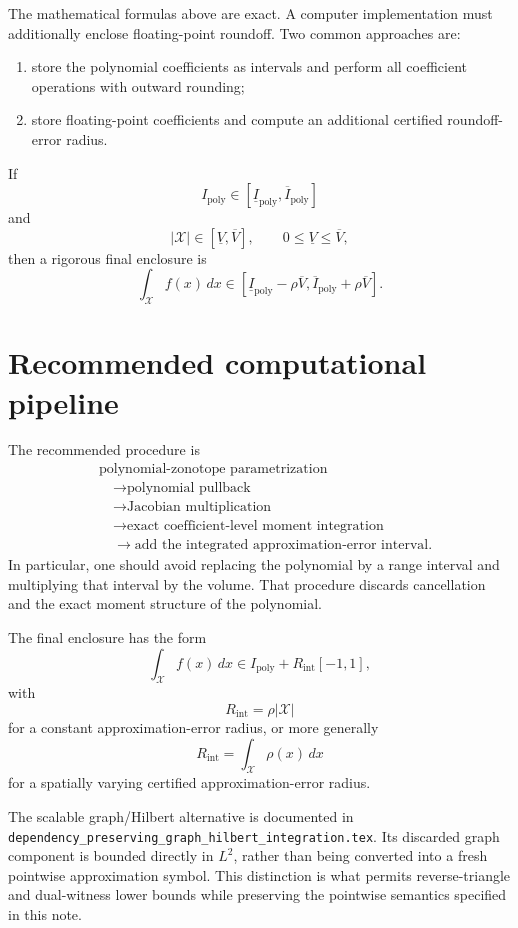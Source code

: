 \documentclass[11pt]{article}
\newcommand{\abs}[1]{\left\lvert #1\right\rvert}
\begin{document}
The mathematical formulas above are exact. A computer implementation must additionally enclose floating-point roundoff. Two common approaches are:
\begin{enumerate}[label=\arabic*.]
    \item store the polynomial coefficients as intervals and perform all coefficient operations with outward rounding;
    \item store floating-point coefficients and compute an additional certified roundoff-error radius.
\end{enumerate}
If
\[
    I_{\mathrm{poly}}
    \in
    [\underline{I}_{\mathrm{poly}},\overline{I}_{\mathrm{poly}}]
\]
and
\[
    \abs{\mathcal{X}}
    \in
    [\underline{V},\overline{V}],
    \qquad
    0\leq\underline{V}\leq\overline{V},
\]
then a rigorous final enclosure is
\begin{equation}
    \int_{\mathcal{X}}f(x)\,dx
    \in
    [\underline{I}_{\mathrm{poly}}-\rho\overline{V},
     \overline{I}_{\mathrm{poly}}+\rho\overline{V}].
    \label{eq:roundoff-safe-final}
\end{equation}

\section{Recommended computational pipeline}

The recommended procedure is
\[
\boxed{
\begin{aligned}
&\text{polynomial-zonotope parametrization}
\\
&\quad\longrightarrow\text{polynomial pullback}
\\
&\quad\longrightarrow\text{Jacobian multiplication}
\\
&\quad\longrightarrow\text{exact coefficient-level moment integration}
\\
&\quad\longrightarrow\text{add the integrated approximation-error interval}.
\end{aligned}
}
\]
In particular, one should avoid replacing the polynomial by a range interval and multiplying that interval by the volume. That procedure discards cancellation and the exact moment structure of the polynomial.

The final enclosure has the form
\[
    \boxed{
    \int_{\mathcal{X}}f(x)\,dx
    \in
    I_{\mathrm{poly}}+R_{\mathrm{int}}[-1,1],
    }
\]
with
\[
    R_{\mathrm{int}}=\rho\abs{\mathcal{X}}
\]
for a constant approximation-error radius, or more generally
\[
    R_{\mathrm{int}}=\int_{\mathcal{X}}\rho(x)\,dx
\]
for a spatially varying certified approximation-error radius.

The scalable graph/Hilbert alternative is documented in
\texttt{dependency\_preserving\_graph\_hilbert\_integration.tex}.  Its
discarded graph component is bounded directly in $L^2$, rather than being
converted into a fresh pointwise approximation symbol.  This distinction is
what permits reverse-triangle and dual-witness lower bounds while preserving
the pointwise semantics specified in this note.
\end{document}
